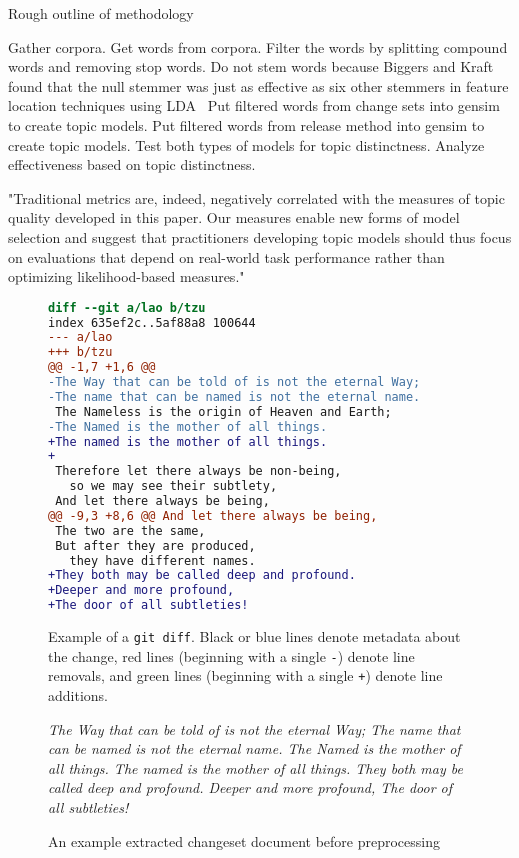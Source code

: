 Rough outline of methodology

Gather corpora.
Get words from corpora.
Filter the words by splitting compound words and removing stop words.
Do not stem words because Biggers and Kraft found that the null stemmer was just as effective as six other stemmers in feature location techniques using LDA~\cite{Biggers-Kraft:2012}
Put filtered words from change sets into gensim to create topic models.
Put filtered words from release method into gensim to create topic models.
Test both types of models for topic distinctness.
Analyze effectiveness based on topic distinctness.


"Traditional metrics are, indeed, negatively correlated with the
measures of topic quality developed in this paper.  Our measures enable
new forms of model selection and suggest that practitioners developing
topic models should thus focus on evaluations that depend on real-world
task performance rather than optimizing likelihood-based measures." ~\cite{Chang-etal:2009}

\begin{figure}[ht]
\centering
\footnotesize
\begin{lstlisting}[language=diff, basicstyle=\ttfamily]
diff --git a/lao b/tzu
index 635ef2c..5af88a8 100644
--- a/lao
+++ b/tzu
@@ -1,7 +1,6 @@
-The Way that can be told of is not the eternal Way;
-The name that can be named is not the eternal name.
 The Nameless is the origin of Heaven and Earth;
-The Named is the mother of all things.
+The named is the mother of all things.
+
 Therefore let there always be non-being,
   so we may see their subtlety,
 And let there always be being,
@@ -9,3 +8,6 @@ And let there always be being,
 The two are the same,
 But after they are produced,
   they have different names.
+They both may be called deep and profound.
+Deeper and more profound,
+The door of all subtleties!
\end{lstlisting}
\caption{Example of a \texttt{git diff}. Black or blue lines denote metadata about the change, red lines (beginning with a single \texttt{-}) denote line removals, and green lines (beginning with a single \texttt{+}) denote line additions.}
\label{fig:diff}
\end{figure}

\begin{figure}[ht]
\em
\footnotesize
The Way that can be told of is not the eternal Way;
The name that can be named is not the eternal name.
The Named is the mother of all things.
The named is the mother of all things.
They both may be called deep and profound.
Deeper and more profound,
The door of all subtleties!
\caption{An example extracted changeset document before preprocessing}
\label{fig:diffdocument}
\end{figure}

